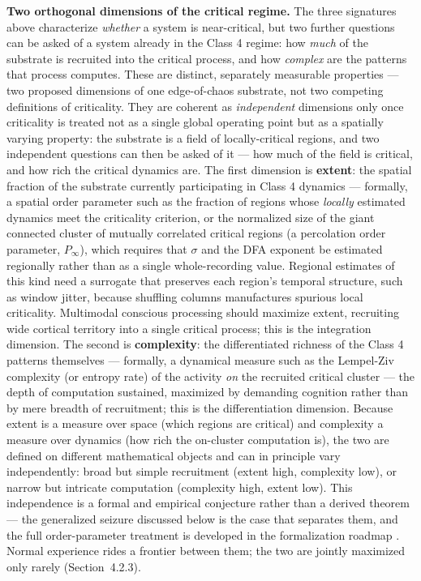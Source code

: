 \documentclass[12pt]{article}
\newcommand{\revstart}{}
\begin{document}
{\revstart\textbf{Two orthogonal dimensions of the critical regime.} The three signatures above characterize \emph{whether} a system is near-critical, but two further questions can be asked of a system already in the Class 4 regime: how \emph{much} of the substrate is recruited into the critical process, and how \emph{complex} are the patterns that process computes. These are distinct, separately measurable properties --- two proposed dimensions of one edge-of-chaos substrate, not two competing definitions of criticality. They are coherent as \emph{independent} dimensions only once criticality is treated not as a single global operating point but as a spatially varying property: the substrate is a field of locally-critical regions, and two independent questions can then be asked of it --- how much of the field is critical, and how rich the critical dynamics are. The first dimension is \textbf{extent}: the spatial fraction of the substrate currently participating in Class 4 dynamics --- formally, a spatial order parameter such as the fraction of regions whose \emph{locally} estimated dynamics meet the criticality criterion, or the normalized size of the giant connected cluster of mutually correlated critical regions (a percolation order parameter, $P_\infty$), which requires that $\sigma$ and the DFA exponent be estimated regionally rather than as a single whole-recording value. Regional estimates of this kind need a surrogate that preserves each region's temporal structure, such as window jitter, because shuffling columns manufactures spurious local criticality. Multimodal conscious processing should maximize extent, recruiting wide cortical territory into a single critical process; this is the integration dimension. The second is \textbf{complexity}: the differentiated richness of the Class 4 patterns themselves --- formally, a dynamical measure such as the Lempel-Ziv complexity (or entropy rate) of the activity \emph{on} the recruited critical cluster --- the depth of computation sustained, maximized by demanding cognition rather than by mere breadth of recruitment; this is the differentiation dimension. Because extent is a measure over space (which regions are critical) and complexity a measure over dynamics (how rich the on-cluster computation is), the two are defined on different mathematical objects and can in principle vary independently: broad but simple recruitment (extent high, complexity low), or narrow but intricate computation (complexity high, extent low). This independence is a formal and empirical conjecture rather than a derived theorem --- the generalized seizure discussed below is the case that separates them, and the full order-parameter treatment is developed in the formalization roadmap \citep{Gruber2026b}. Normal experience rides a frontier between them; the two are jointly maximized only rarely (Section~4.2.3).

}
\end{document}

